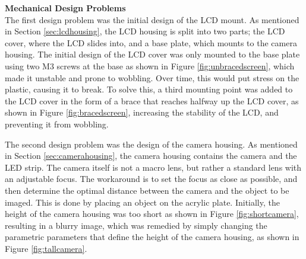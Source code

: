 \noindent
\textbf{Mechanical Design Problems} \\
The first design problem was the initial design of the LCD mount. As mentioned in Section \ref{sec:lcdhousing},
the LCD housing is split into two parts; the LCD cover, where the LCD slides into, and a base plate, which mounts to the camera housing.
The initial design of the LCD cover was only mounted to the base plate using two M3 screws at the base as shown in Figure \ref{fig:unbracedscreen}, which made it unstable and prone to wobbling.
Over time, this would put stress on the plastic, causing it to break. To solve this, a third mounting point was added to the LCD cover in the form of a 
brace that reaches halfway up the LCD cover, as shown in Figure \ref{fig:bracedscreen}, increasing the stability of the LCD, and preventing it from wobbling.

The second design problem was the design of the camera housing. As mentioned in Section \ref{sec:camerahousing}, the camera housing contains the camera and the LED strip.
The camera itself is not a macro lens, but rather a standard lens with an adjustable focus. The workaround is to set the focus as close as possible, and then determine the optimal
distance between the camera and the object to be imaged. This is done by placing an object on the acrylic plate. Initially, the height of the camera housing was too short as shown in Figure \ref{fig:shortcamera}, resulting in a 
blurry image, which was remedied by simply changing the parametric parameters that define the height of the camera housing, as shown in Figure \ref{fig:tallcamera}. 

